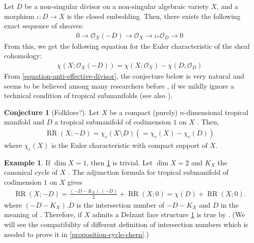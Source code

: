 \documentclass[a4paper,dvipdfmx,reqno,12pt]{amsart}
\theoremstyle{definition}
\newtheorem{example}[theorem]{Example}
\newtheorem{conjecture}[theorem]{Conjecture}
\newcommand{\opn}[1]{\operatorname{#1}}
\numberwithin{equation}{section}
\begin{document}
Let $D$ be a non-singular divisor on a non-singular
algebraic variety $X$, and a morphism  
$\iota\colon D\to X$ is the closed embedding.
Then, there exists the following exact sequence
of sheaves:
\begin{align}
     0\to \mathcal{O}_X(-D)\to 
\mathcal{O}_X\to \iota_*\mathcal{O}_D\to 0
\end{align}
From this, we get the following equation for the Euler
characteristic of the sheaf cohomology:
\begin{align}
\label{equation-anti-effective-divisor}
\chi(X;\mathcal{O}_X(-D))=\chi(X;\mathcal{O}_X)
-\chi(D;\mathcal{O}_D)
\end{align}
From \eqref{equation-anti-effective-divisor},
the conjecture below is very natural and 
seems to be believed among many researchers
before \cite{demedrano2023chern}, if
we mildly ignore a technical condition of 
tropical submanifolds \cite{demedrano2023chern} (see also
\cite[Definition 4.3]{shaw2015tropical}).

\begin{conjecture}[{Folklore?}]
\label{conjecture-rr-c-euler}
Let $X$ be a compact
(purely) $n$-dimensional tropical manifold and
$D$ a tropical submanifold of codimension $1$
on $X$ 
\cite[Definition 2.14]{demedrano2023chern}.
Then,
\begin{align}
\opn{RR}(X;-D)=
\chi_c (X\setminus D) (=\chi_c (X)-\chi_c(D))
\end{align}
where $\chi_c(X)$ is the Euler characteristic
with compact support of $X$.
\end{conjecture}

\begin{example}
If $\dim X=1$, then 
\cref{conjecture-rr-c-euler} is trivial.
Let $\dim X=2$ and $K_X$ the canonical cycle of
$X$ \cite[Definition 5.8]{MR2275625}.
The adjunction formula for tropical submanifold
of codimension $1$ on $X$
\cite[Theorem 6]{shaw2015tropical} gives
\begin{align}
\opn{RR}(X;-D)=\frac{(-D-K_X).(-D)}{2}+\opn{RR}(X;0)
=\chi(D)+\opn{RR}(X;0).
\end{align}
where $(-D-K_X).D$ is the intersection number of 
$-D-K_X$ and $D$ in the meaning of \cite{shaw2015tropical}.
Therefore, if $X$ admits a Delzant face structure 
\cref{conjecture-rr-c-euler} is true
by \cite[Theorem 6.3]{demedrano2023chern}.
(We will see the compatibility of different definition of
intersection numbers which is needed to prove it in 
\cref{proposition-cycle-chern}.)
\end{example}
\end{document}

